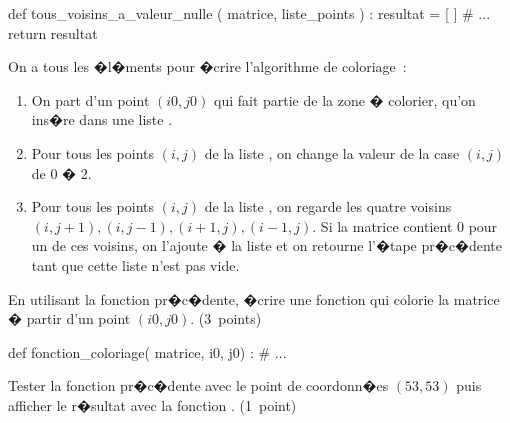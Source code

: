 \begin{verbatimx}
def tous_voisins_a_valeur_nulle ( matrice, liste_points ) :
    resultat = [ ]
    # ...
    return resultat
\end{verbatimx}

\exequest On a tous les �l�ments pour �crire l'algorithme de coloriage~:
\begin{enumerate}
\item On part d'un point $(i0,j0)$ qui fait partie de la zone � colorier, qu'on ins�re dans une liste .
\item Pour tous les points $(i,j)$ de la liste , on change la valeur de la case $(i,j)$ de 0 � 2.
\item Pour tous les points $(i,j)$ de la liste , on regarde les quatre voisins $(i,j+1), (i,j-1), (i+1,j), (i-1,j)$. Si la matrice contient 0 pour un de ces voisins, on l'ajoute � la liste et on retourne l'�tape pr�c�dente tant que cette liste n'est pas vide.
\end{enumerate}

En utilisant la fonction pr�c�dente, �crire une fonction qui colorie la matrice � partir d'un point $(i0,j0)$. (3~points)

\begin{verbatimx}
def fonction_coloriage( matrice, i0, j0) :
    # ...
\end{verbatimx}


\exequest Tester la fonction pr�c�dente avec le point de coordonn�es $(53,53)$ puis afficher le r�sultat avec la fonction . (1~point)
